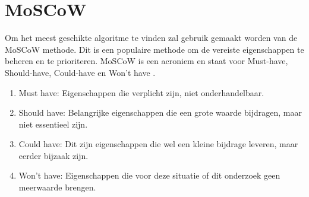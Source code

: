 \section{MoSCoW}
Om het meest geschikte algoritme te vinden zal gebruik gemaakt worden van de MoSCoW methode. Dit is een populaire methode om de vereiste eigenschappen te beheren en te prioriteren. MoSCoW is een acroniem en staat voor Must-have, Should-have, Could-have en Won't have \autocite{ProductPlan}.

\begin{enumerate}
    \item Must have: Eigenschappen die verplicht zijn, niet onderhandelbaar.
    \item Should have: Belangrijke eigenschappen die een grote waarde bijdragen, maar niet essentieel zijn.
    \item Could have: Dit zijn eigenschappen die wel een kleine bijdrage leveren, maar eerder bijzaak zijn.
    \item Won't have: Eigenschappen die voor deze situatie of dit onderzoek geen meerwaarde brengen.
\end{enumerate}







